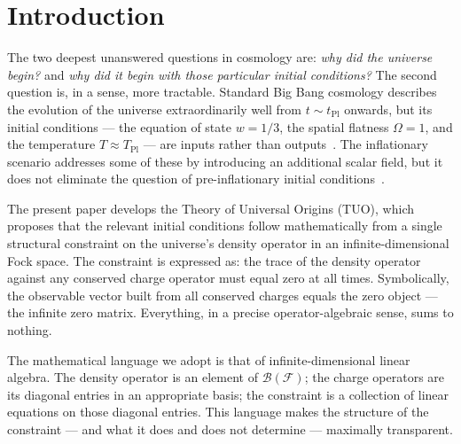 \documentclass[12pt,a4paper]{article}
\theoremstyle{definition}
\theoremstyle{remark}
\newcommand{\tPl}{t_{\mathrm{Pl}}}
\newcommand{\TPl}{T_{\mathrm{Pl}}}
\newcommand{\Fock}{\mathcal{F}}
\begin{document}
\tableofcontents
\newpage
\onehalfspacing

\section{Introduction}

The two deepest unanswered questions in cosmology are: \emph{why did the
universe begin?} and \emph{why did it begin with those particular initial
conditions?}
The second question is, in a sense, more tractable.
Standard Big Bang cosmology describes the evolution of the universe
extraordinarily well from $t \sim \tPl$ onwards, but its initial
conditions --- the equation of state $w = 1/3$, the spatial flatness
$\Omega = 1$, and the temperature $T \approx \TPl$ --- are inputs rather
than outputs~\cite{Weinberg2008,Kolb1990}.
The inflationary scenario addresses some of these by introducing an
additional scalar field, but it does not eliminate the question of
pre-inflationary initial conditions~\cite{Guth1981,Linde1982}.

The present paper develops the Theory of Universal Origins (TUO),
which proposes that the relevant initial conditions follow mathematically
from a single structural constraint on the universe's density operator
in an infinite-dimensional Fock space.
The constraint is expressed as: the trace of the density operator against
any conserved charge operator must equal zero at all times.
Symbolically, the observable vector built from all conserved charges
equals the zero object --- the infinite zero matrix.
Everything, in a precise operator-algebraic sense, sums to nothing.

The mathematical language we adopt is that of infinite-dimensional linear
algebra.
The density operator is an element of $\mathcal{B}(\Fock)$; the charge
operators are its diagonal entries in an appropriate basis; the constraint
is a collection of linear equations on those diagonal entries.
This language makes the structure of the constraint --- and what it does and
does not determine --- maximally transparent.
\end{document}
